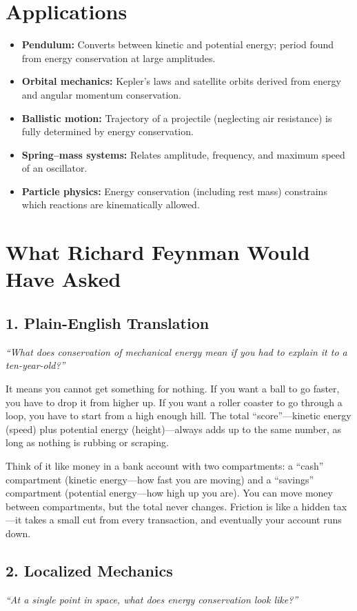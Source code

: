 \section*{Applications}

\begin{itemize}
\item \textbf{Pendulum:} Converts between kinetic and potential energy; period found from energy conservation at large amplitudes.
\item \textbf{Orbital mechanics:} Kepler's laws and satellite orbits derived from energy and angular momentum conservation.
\item \textbf{Ballistic motion:} Trajectory of a projectile (neglecting air resistance) is fully determined by energy conservation.
\item \textbf{Spring--mass systems:} Relates amplitude, frequency, and maximum speed of an oscillator.
\item \textbf{Particle physics:} Energy conservation (including rest mass) constrains which reactions are kinematically allowed.
\end{itemize}
\section*{What Richard Feynman Would Have Asked}

\subsection*{1. Plain-English Translation}
\textit{``What does conservation of mechanical energy mean if you had to explain it to a ten-year-old?''}

It means you cannot get something for nothing. If you want a ball to go faster, you have to drop it from higher up. If you want a roller coaster to go through a loop, you have to start from a high enough hill. The total ``score''---kinetic energy (speed) plus potential energy (height)---always adds up to the same number, as long as nothing is rubbing or scraping.

Think of it like money in a bank account with two compartments: a ``cash'' compartment (kinetic energy---how fast you are moving) and a ``savings'' compartment (potential energy---how high up you are). You can move money between compartments, but the total never changes. Friction is like a hidden tax---it takes a small cut from every transaction, and eventually your account runs down.

\subsection*{2. Localized Mechanics}
\textit{``At a single point in space, what does energy conservation look like?''}

